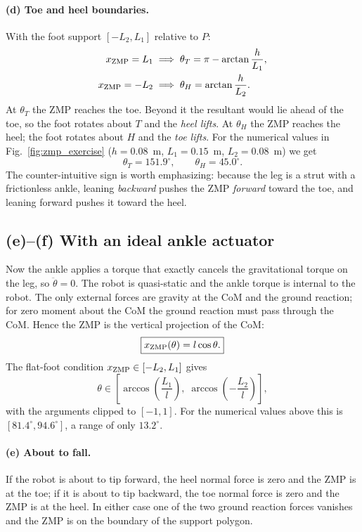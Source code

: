 \documentclass[11pt]{article}
\begin{document}
\paragraph{(d) Toe and heel boundaries.}
With the foot support $[-L_2,L_1]$ relative to $P$:
\begin{align}
x_{\rm ZMP}=L_1 &\;\Longrightarrow\;
\theta_T=\pi-\arctan\frac{h}{L_1},
\label{eq:theta_T}\\
x_{\rm ZMP}=-L_2 &\;\Longrightarrow\;
\theta_H=\arctan\frac{h}{L_2}.
\label{eq:theta_H}
\end{align}
At $\theta_T$ the ZMP reaches the toe.  Beyond it the resultant would lie ahead
of the toe, so the foot rotates about $T$ and the \emph{heel lifts}.  At
$\theta_H$ the ZMP reaches the heel; the foot rotates about $H$ and the
\emph{toe lifts}.  For the numerical values in
Fig.~\ref{fig:zmp_exercise} ($h=0.08$~m, $L_1=0.15$~m, $L_2=0.08$~m) we get
\[
\theta_T=151.9^\circ,\qquad \theta_H=45.0^\circ .
\]
The counter-intuitive sign is worth emphasizing: because the leg is a strut
with a frictionless ankle, leaning \emph{backward} pushes the ZMP
\emph{forward} toward the toe, and leaning forward pushes it toward the heel.

\subsection{(e)--(f) With an ideal ankle actuator}

Now the ankle applies a torque that exactly cancels the gravitational torque
on the leg, so $\ddot\theta=0$.  The robot is quasi-static and the ankle torque
is internal to the robot.  The only external forces are gravity at the CoM and
the ground reaction; for zero moment about the CoM the ground reaction must
pass through the CoM.  Hence the ZMP is the vertical projection of the CoM:
\begin{equation}
\boxed{x_{\rm ZMP}(\theta)=l\cos\theta .}
\label{eq:zmp_actuated}
\end{equation}
The flat-foot condition $x_{\rm ZMP}\in[-L_2,L_1]$ gives
\begin{equation}
\theta\in\left[
\arccos\!\left(\frac{L_1}{l}\right),\;
\arccos\!\left(-\frac{L_2}{l}\right)
\right],
\label{eq:theta_range}
\end{equation}
with the arguments clipped to $[-1,1]$.  For the numerical values above this
is $[81.4^\circ,94.6^\circ]$, a range of only $13.2^\circ$.

\paragraph{(e) About to fall.}
If the robot is about to tip forward, the heel normal force is zero and the
ZMP is at the toe; if it is about to tip backward, the toe normal force is zero
and the ZMP is at the heel.  In either case one of the two ground reaction
forces vanishes and the ZMP is on the boundary of the support polygon.
\end{document}
